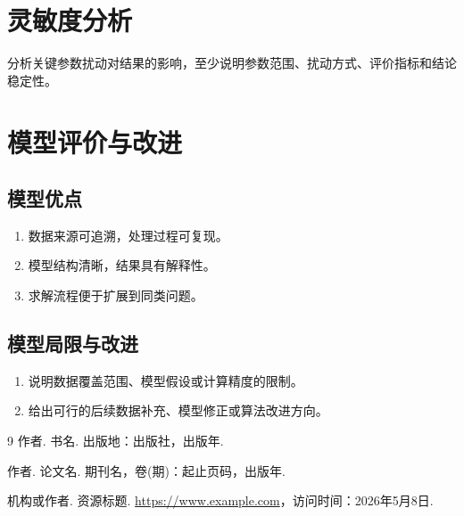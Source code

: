 \documentclass[12pt,a4paper]{article}
\newcommand{\bibfont}{\fontsize{10.5pt}{15pt}\selectfont\songti}
\begin{document}
\section{灵敏度分析}

分析关键参数扰动对结果的影响，至少说明参数范围、扰动方式、评价指标和结论稳定性。

\section{模型评价与改进}

\subsection{模型优点}

\begin{enumerate}[itemsep=0.2em,topsep=0.2em]
    \item 数据来源可追溯，处理过程可复现。
    \item 模型结构清晰，结果具有解释性。
    \item 求解流程便于扩展到同类问题。
\end{enumerate}

\subsection{模型局限与改进}

\begin{enumerate}[itemsep=0.2em,topsep=0.2em]
    \item 说明数据覆盖范围、模型假设或计算精度的限制。
    \item 给出可行的后续数据补充、模型修正或算法改进方向。
\end{enumerate}

\newpage
\label{body:end}
\renewcommand{\refname}{参考文献}
\begingroup
\bibfont
\begin{thebibliography}{9}
    作者. 书名. 出版地：出版社，出版年.

    作者. 论文名. 期刊名，卷(期)：起止页码，出版年.

    机构或作者. 资源标题. \url{https://www.example.com}，访问时间：2026年5月8日.
\end{thebibliography}
\endgroup
\end{document}
